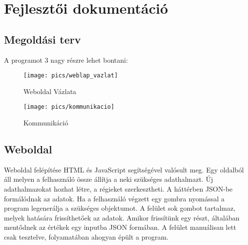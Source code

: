 \chapter{Fejlesztői dokumentáció}
\begin{comment}
A Fejlesztői dokumentáció tartalmazza
- a probléma részletes specifikációját,
- a felhasznált módszerek részletes leírását, a használt fogalmak definícióját,
- a program logikai és fizikai szerkezetének leírását (adatszerkezetek, adatbázisok,
modulfelbontás),
- a tesztelési tervet és a tesztelés eredményeit.
\end{comment}

\section{Megoldási terv}
A programot 3 nagy részre lehet bontani: 

\begin{figure}[h]
\texttt{[image: pics/weblap\_vazlat]}
\centering
\caption{Weboldal Vázlata}
\end{figure}

\begin{figure}[h]
\texttt{[image: pics/kommunikacio]}
\centering
\caption{Kommunikáció}
\end{figure}

\section{Weboldal}
Weboldal felépítése HTML és JavaScript segítségével valósult meg. Egy oldalból áll melyen a felhasználó össze állítja a neki szükséges adathalmazt. Új adathalmazokat hozhat létre, a régieket szerkesztheti. A háttérben JSON-be formálódnak az adatok.
Ha a felhasználó végzett egy gombra nyomással a program legenerálja a szükséges objektumot. \newline
A felület sok gombot tartalmaz, melyek hatására frissíthetőek az adatok. Amikor frissítünk egy részt, általában mentődnek az értékek egy inputba JSON formában.\newline
A felület manuálisan lett csak tesztelve, folyamatában ahogyan épült a program.
